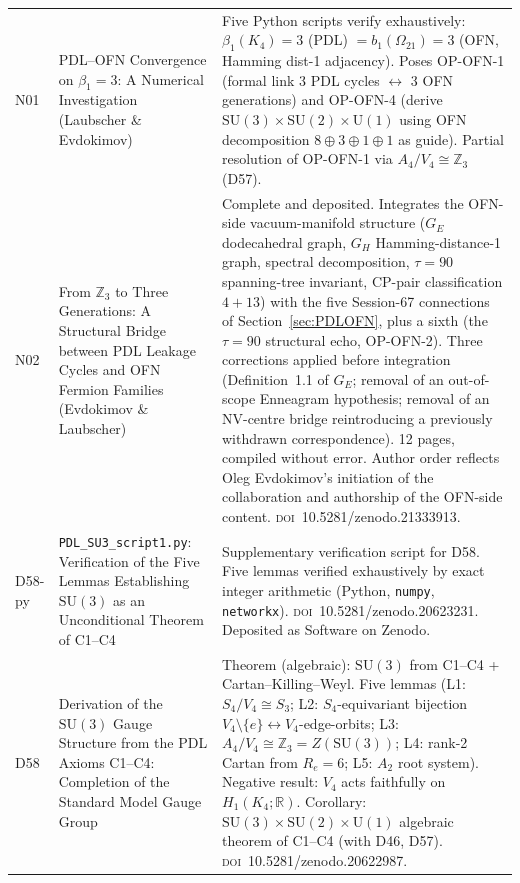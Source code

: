 \documentclass[11pt,a4paper]{article}
\theoremstyle{plain}
\theoremstyle{definition}
\theoremstyle{remark}
\newcommand{\Kfour}{K_4}
\begin{document}
\begin{longtable}{L{1.3cm}L{3.8cm}L{8.0cm}}
N01 & PDL--OFN Convergence on $\beta_1=3$: A Numerical Investigation (Laubscher \& Evdokimov)~\cite{N01} & Five Python scripts verify exhaustively: $\beta_1(\Kfour)=3$ (PDL) $= b_1(\Omega_{21})=3$ (OFN, Hamming dist-1 adjacency). Poses OP-OFN-1 (formal link 3 PDL cycles $\leftrightarrow$ 3 OFN generations) and OP-OFN-4 (derive $\mathrm{SU}(3)\times\mathrm{SU}(2)\times\mathrm{U}(1)$ using OFN decomposition $8\oplus3\oplus1\oplus1$ as guide). Partial resolution of OP-OFN-1 via $A_4/V_4 \cong \mathbb{Z}_3$ (D57).\\[0.4em]
N02 & From $\mathbb{Z}_3$ to Three Generations: A Structural Bridge between PDL Leakage Cycles and OFN Fermion Families (Evdokimov \& Laubscher)~\cite{N02} & Complete and deposited. Integrates the OFN-side vacuum-manifold structure ($G_E$ dodecahedral graph, $G_H$ Hamming-distance-1 graph, spectral decomposition, $\tau=90$ spanning-tree invariant, CP-pair classification $4+13$) with the five Session-67 connections of Section~\ref{sec:PDLOFN}, plus a sixth (the $\tau=90$ structural echo, OP-OFN-2). Three corrections applied before integration (Definition~1.1 of $G_E$; removal of an out-of-scope Enneagram hypothesis; removal of an NV-centre bridge reintroducing a previously withdrawn correspondence). 12 pages, compiled without error. Author order reflects Oleg Evdokimov's initiation of the collaboration and authorship of the OFN-side content. \textsc{doi}~10.5281/zenodo.21333913.\\[0.4em]
D58-py & \texttt{PDL\_SU3\_script1.py}: Verification of the Five Lemmas Establishing $\mathrm{SU}(3)$ as an Unconditional Theorem of C1--C4~\cite{D58py} & Supplementary verification script for D58. Five lemmas verified exhaustively by exact integer arithmetic (Python, \texttt{numpy}, \texttt{networkx}). \textsc{doi}~10.5281/zenodo.20623231. Deposited as Software on Zenodo.\\[0.4em]
D58 & Derivation of the $\mathrm{SU}(3)$ Gauge Structure from the PDL Axioms C1--C4: Completion of the Standard Model Gauge Group~\cite{D58} & \textcolor{proofblue}{Theorem} (algebraic): $\mathrm{SU}(3)$ from C1--C4 + Cartan--Killing--Weyl. Five lemmas (L1: $S_4/V_4\cong S_3$; L2: $S_4$-equivariant bijection $V_4\setminus\{e\}\leftrightarrow V_4$-edge-orbits; L3: $A_4/V_4\cong\mathbb{Z}_3 = Z(\mathrm{SU}(3))$; L4: rank-2 Cartan from $R_e=6$; L5: $A_2$ root system). Negative result: $V_4$ acts faithfully on $H_1(K_4;\mathbb{R})$. Corollary: $\mathrm{SU}(3)\times\mathrm{SU}(2)\times\mathrm{U}(1)$ algebraic theorem of C1--C4 (with D46, D57). \textsc{doi}~10.5281/zenodo.20622987.\\[0.4em]

\end{longtable}
\end{document}

